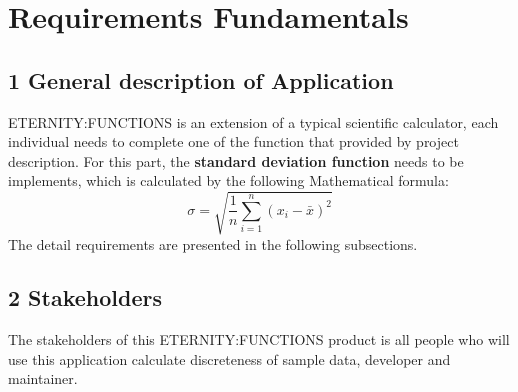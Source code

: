 \documentclass[11pt]{report}
\begin{document}
\section*{Requirements Fundamentals}
\subsection*{1 General description of Application}
    ETERNITY:FUNCTIONS is an extension of a typical scientific calculator, each individual needs to complete one of the function that provided by project description. For this part, the \textbf{standard deviation function} needs to be implements, which is calculated by the following Mathematical formula:
    \vspace{0.5cm}
 $$\sigma=\sqrt{\frac{1}{n}{\sum_{i=1}^n(x_i-\bar{x})^2}}$$
The detail requirements are presented in the following subsections.
\subsection*{2 Stakeholders}
The stakeholders of this ETERNITY:FUNCTIONS product is all people who will use this application calculate discreteness of sample data, developer and maintainer.
\end{document}
